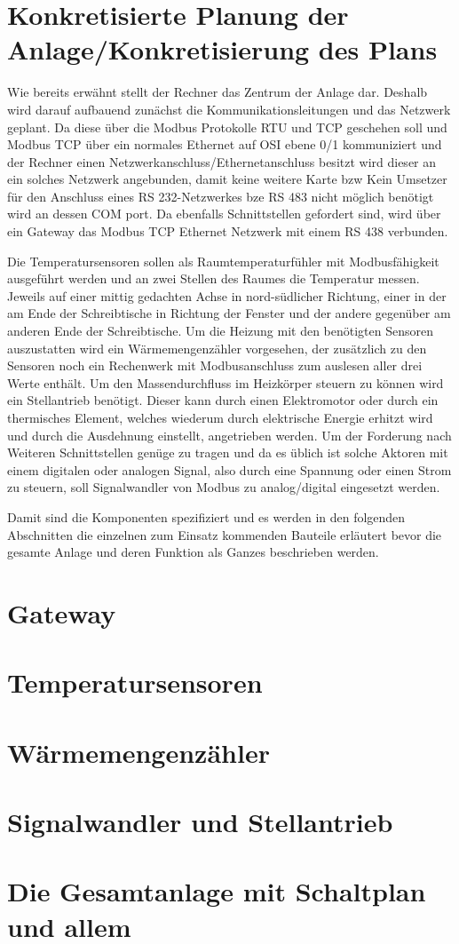\section{Konkretisierte Planung der Anlage/Konkretisierung des Plans}

Wie bereits erwähnt stellt der Rechner das Zentrum der Anlage dar. Deshalb wird darauf aufbauend zunächst die Kommunikationsleitungen und das Netzwerk geplant. Da diese über die Modbus Protokolle RTU und TCP geschehen soll und Modbus TCP über ein normales Ethernet auf OSI ebene 0/1 kommuniziert und der Rechner einen Netzwerkanschluss/Ethernetanschluss besitzt wird dieser an ein solches Netzwerk angebunden, damit keine weitere Karte bzw Kein Umsetzer für den Anschluss eines RS 232-Netzwerkes bze RS 483 nicht möglich benötigt wird an dessen COM port. Da ebenfalls Schnittstellen gefordert sind, wird über ein Gateway das Modbus TCP Ethernet Netzwerk mit einem RS 438 verbunden.

Die Temperatursensoren sollen als Raumtemperaturfühler mit Modbusfähigkeit ausgeführt werden und an zwei Stellen des Raumes die Temperatur messen. Jeweils auf einer mittig gedachten Achse in nord-südlicher Richtung, einer in der am Ende der Schreibtische in Richtung der Fenster und der andere gegenüber am anderen Ende der Schreibtische. 
Um die Heizung mit den benötigten Sensoren auszustatten wird ein Wärmemengenzähler vorgesehen, der zusätzlich zu den Sensoren noch ein Rechenwerk mit Modbusanschluss zum auslesen aller drei Werte enthält. 
Um den Massendurchfluss im Heizkörper steuern zu können wird ein Stellantrieb benötigt. Dieser kann durch einen Elektromotor oder durch ein thermisches Element, welches wiederum durch elektrische Energie erhitzt wird und durch die Ausdehnung einstellt, angetrieben werden. Um der Forderung nach Weiteren Schnittstellen genüge zu tragen und da es üblich ist solche Aktoren mit einem digitalen oder analogen Signal, also durch eine Spannung oder einen Strom zu steuern, soll Signalwandler von Modbus zu analog/digital eingesetzt werden.

Damit sind die Komponenten spezifiziert und es werden in den folgenden Abschnitten die einzelnen zum Einsatz kommenden Bauteile erläutert bevor die gesamte Anlage und deren Funktion als Ganzes beschrieben werden.

\section{Gateway}

\section{Temperatursensoren}

\section{Wärmemengenzähler}

\section{Signalwandler und Stellantrieb}

\section{Die Gesamtanlage mit Schaltplan und allem}